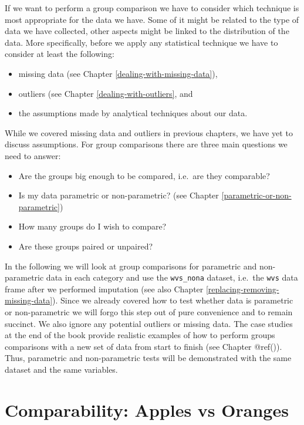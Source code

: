 \documentclass[
]{book}
\begin{document}
If we want to perform a group comparison we have to consider which technique is most appropriate for the data we have. Some of it might be related to the type of data we have collected, other aspects might be linked to the distribution of the data. More specifically, before we apply any statistical technique we have to consider at least the following:

\begin{itemize}
\item
  missing data (see Chapter \ref{dealing-with-missing-data}),
\item
  outliers (see Chapter \ref{dealing-with-outliers}, and
\item
  the assumptions made by analytical techniques about our data.
\end{itemize}

While we covered missing data and outliers in previous chapters, we have yet to discuss assumptions. For group comparisons there are three main questions we need to answer:

\begin{itemize}
\item
  Are the groups big enough to be compared, i.e.~are they comparable?
\item
  Is my data parametric or non-parametric? (see Chapter \ref{parametric-or-non-parametric})
\item
  How many groups do I wish to compare?
\item
  Are these groups paired or unpaired?
\end{itemize}

In the following we will look at group comparisons for parametric and non-parametric data in each category and use the \texttt{wvs\_nona} dataset, i.e.~the \texttt{wvs} data frame after we performed imputation (see also Chapter \ref{replacing-removing-missing-data}). Since we already covered how to test whether data is parametric or non-parametric we will forgo this step out of pure convenience and to remain succinct. We also ignore any potential outliers or missing data. The case studies at the end of the book provide realistic examples of how to perform groups comparisons with a new set of data from start to finish (see Chapter @ref()). Thus, parametric and non-parametric tests will be demonstrated with the same dataset and the same variables.

\hypertarget{comparability-apples-vs-oranges}{%
\section{Comparability: Apples vs Oranges}\label{comparability-apples-vs-oranges}}
\end{document}
